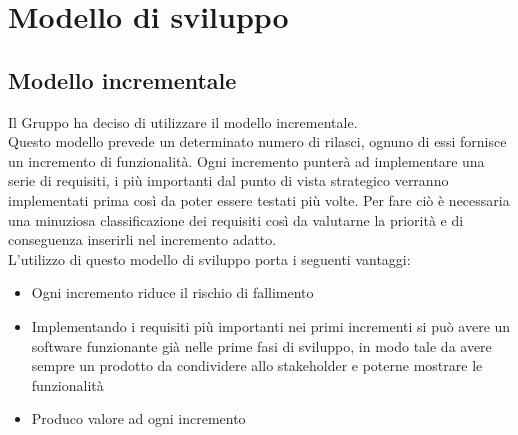 \section{Modello di sviluppo}
\subsection{Modello incrementale}
Il Gruppo ha deciso di utilizzare il modello incrementale. \\
 Questo modello prevede un determinato numero di rilasci, ognuno di essi fornisce un incremento di funzionalità.
Ogni incremento punterà ad implementare una serie di requisiti,  i più importanti dal punto di vista strategico verranno implementati prima così da poter essere testati più volte.  Per fare ciò è necessaria una minuziosa classificazione dei requisiti così da valutarne la priorità e di conseguenza inserirli nel incremento adatto.\\
L'utilizzo di questo modello di sviluppo porta i seguenti vantaggi:
\begin{itemize}
\item Ogni incremento riduce il rischio di fallimento
\item Implementando i requisiti più importanti nei primi incrementi si può avere un software funzionante già nelle prime fasi di sviluppo, in modo tale da avere sempre un prodotto da condividere allo stakeholder e poterne mostrare le funzionalità
\item  Produco valore ad ogni incremento
\end{itemize}



